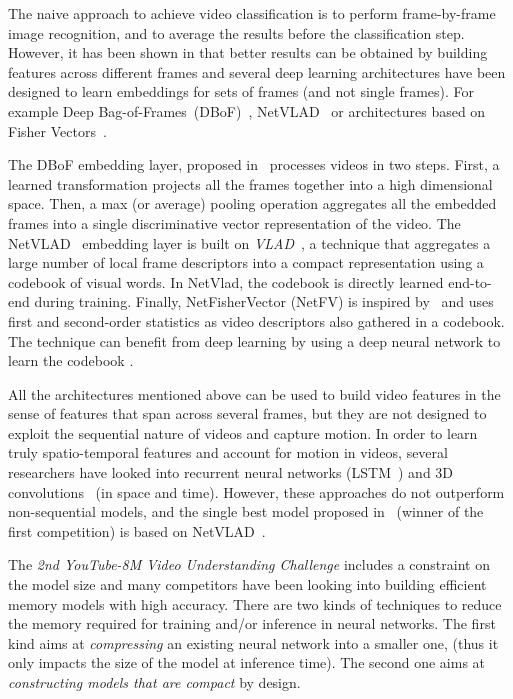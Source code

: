 The naive approach to achieve video classification is to perform frame-by-frame image recognition, and to average the results before the classification step.
However, it has been shown in \cite{abu2016youtube,miech2017learnable} that  better results can be obtained by building features across different frames and several deep learning architectures have been designed to learn embeddings for sets of frames (and not single frames).
For example Deep Bag-of-Frames~(DBoF)~\cite{abu2016youtube}, NetVLAD~\cite{arandjelovic2016netvlad} or architectures based on Fisher Vectors~\cite{perronnin2007fisher}. 

The DBoF embedding layer, proposed in~\cite{abu2016youtube} processes videos in two steps. 
First, a learned transformation projects all the frames together into a high dimensional space. 
Then, a max (or average) pooling operation aggregates all the embedded frames into a single discriminative vector representation of the video.
The NetVLAD~\cite{arandjelovic2016netvlad} embedding layer is built on \emph{VLAD}~\cite{jegou2010aggregating}, a technique that aggregates a large number of local frame descriptors into a compact representation using a codebook of visual words.
In NetVlad, the codebook is directly learned end-to-end during training.
Finally, NetFisherVector (NetFV) is inspired by~\cite{perronnin2007fisher} and uses  first and second-order statistics as video descriptors also gathered in a codebook.
The technique can benefit from deep learning by using a deep neural network to learn the codebook \cite{miech2017learnable}.

All the architectures mentioned above can be used to build video features in the sense of features that span across several frames, but they are not designed to exploit the sequential nature of videos and capture motion.
In order to learn truly spatio-temporal features and account for motion in videos, several researchers have looked into recurrent neural networks (\eg LSTM~\cite{yue2015beyond,li2017temporal}) and 3D convolutions~\cite{karpathy2014large} (in space and time).
However, these approaches do not  outperform non-sequential models, and  the single best model proposed in~\cite{miech2017learnable} (winner of the first \yt competition) is based on NetVLAD~\cite{arandjelovic2016netvlad}. 

The \emph{2nd YouTube-8M Video Understanding Challenge} includes a constraint on the model size and many competitors have been looking into building efficient memory models with high accuracy.
There are two kinds of techniques to reduce the memory required for training and/or inference in neural networks.
The first kind aims at \emph{compressing} an existing neural network into a smaller one, (thus it only impacts the size of the model at inference time).
The second one aims at \emph{constructing models that are compact} by design. 








